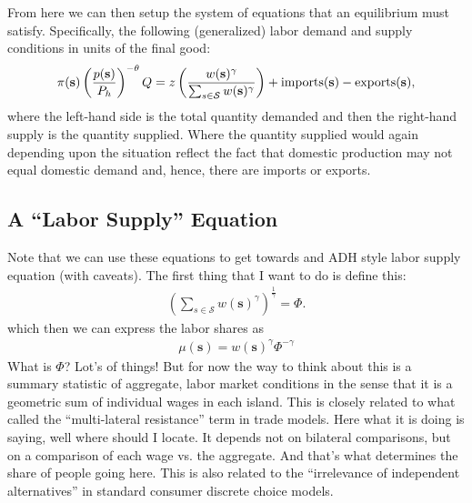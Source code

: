\documentclass[pdftex,12pt]{article}
\begin{document}
From here we can then setup the system of equations that an equilibrium must satisfy. Specifically, the following (generalized) labor demand and supply conditions in units of the final good:
\begin{align}
\pi(\textbf{s}) \left(\frac{p(\textbf{s})}{P_h}\right)^{-\theta}Q =  z \left(\frac{w(\textbf{s})^{\gamma}}{\sum_{s \in \mathcal{S}} w(\textbf{s})^{\gamma}} \right) + \mbox{\normalfont imports}(\textbf{s}) - \mbox{\normalfont exports(\textbf{s})} ,
\end{align}
where the left-hand side is the total quantity demanded and then the right-hand supply is the quantity supplied. Where the quantity supplied would again depending upon the situation reflect the fact that domestic production may not equal domestic demand and, hence, there are imports or exports.

\newpage

\subsection{A ``Labor Supply'' Equation}

Note that we can use these equations to get towards and ADH style labor supply equation (with caveats). The first thing that I want to do is define this:
\begin{align}
\left(\sum_{s \in \mathcal{S}} w(\textbf{s})^{\gamma}\right)^{\frac{1}{\gamma}} = \Phi.
\label{eq:multi_lat_resit}
\end{align}
which then we can express the labor shares as
\begin{align}
\mu(\textbf{s}) = w(\textbf{s})^{\gamma}\Phi^{-\gamma}
\label{eq:simple_mu}
\end{align} 
What is $\Phi$? Lot's of things! But for now the way to think about this is a summary statistic of aggregate, labor market conditions in the sense that it is a geometric sum of individual wages in each island. This is closely related to what \citet{anderson2004trade} called the ``multi-lateral resistance'' term in trade models. Here what it is doing is saying, well where should I locate. It depends not on bilateral comparisons, but on a comparison of each wage vs. the aggregate. And that's what determines the share of people going here. This is also related to the ``irrelevance of independent alternatives'' in standard consumer discrete choice models. 
\end{document}
